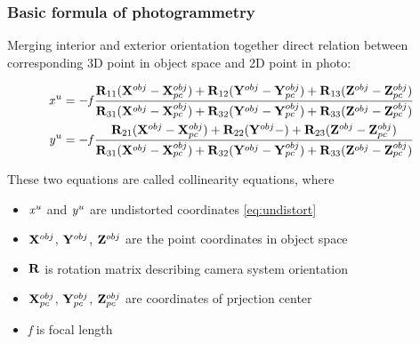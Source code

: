 \documentclass[a4paper,12pt]{article}
\newcommand{\ematr}[1]{
{\bf #1}
}
\newcommand{\evect}[1]{
{\bf #1}
}
\newcommand{\escal}[1]{
{\it #1}
}
\begin{document}
\subsubsection{Basic formula of photogrammetry}

Merging interior and exterior orientation together direct relation between corresponding 3D point in object space and 2D point
in photo:

\begin{equation}
\label{eq:col_eqs}
\begin{split}
&\escal{x}^{u} = -\escal{f}\frac{\ematr{R}_{11}(\evect{X}^{obj} - \evect{X}^{obj}_{pc}) + 
                                  \ematr{R}_{12}(\evect{Y}^{obj} - \evect{Y}^{obj}_{pc}) + 
                                  \ematr{R}_{13}(\evect{Z}^{obj} - \evect{Z}^{obj}_{pc})                                  
                                  }{
				  \ematr{R}_{31}(\evect{X}^{obj} - \evect{X}^{obj}_{pc}) + 
                                  \ematr{R}_{32}(\evect{Y}^{obj} - \evect{Y}^{obj}_{pc}) + 
                                  \ematr{R}_{33}(\evect{Z}^{obj} - \evect{Z}^{obj}_{pc})     
                                  } \\
&\escal{y}^{u} = -\escal{f}\frac{\ematr{R}_{21}(\evect{X}^{obj} - \evect{X}^{obj}_{pc}) + 
                                  \ematr{R}_{22}(\evect{Y}^{obj} - ) + 
                                  \ematr{R}_{23}(\evect{Z}^{obj} - \evect{Z}^{obj}_{pc})                                  
                                  }{
				  \ematr{R}_{31}(\evect{X}^{obj} - \evect{X}^{obj}_{pc}) + 
                                  \ematr{R}_{32}(\evect{Y}^{obj} - \evect{Y}^{obj}_{pc}) + 
                                  \ematr{R}_{33}(\evect{Z}^{obj} - \evect{Z}^{obj}_{pc})     
                                  }
\end{split}
\end{equation}

These two equations are called collinearity equations, where
\begin{itemize}
  \item $\escal{x}^{u}$ and $\escal{y}^{u}$ are undistorted coordinates \eqref{eq:undistort}
  \item $\evect{X}^{obj}$, $\evect{Y}^{obj}$, $\evect{Z}^{obj}$ are the point coordinates in object space
  \item $\ematr{R}$ is rotation matrix describing camera system orientation
  \item $\evect{X}^{obj}_{pc}$, $\evect{Y}^{obj}_{pc}$, $\evect{Z}^{obj}_{pc}$ are coordinates of prjection center
  \item \escal{f} is focal length
\end{itemize}
\end{document}
